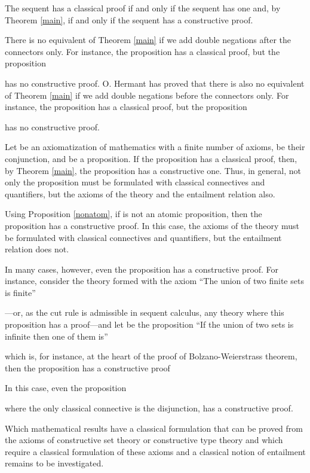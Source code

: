 \documentclass{article}
\begin{document}
The sequent  has a classical proof
if and only if the sequent 
 has one and, by Theorem \ref{main}, 
if and only if the sequent  has a constructive proof.

\smallskip

There is no equivalent of Theorem \ref{main} if we add double negations 
after the connectors only. For instance, the proposition
 has a classical proof, but the proposition

has no constructive proof. O. Hermant \cite{Hermant} has proved that 
there is also no equivalent of Theorem \ref{main} if we add double 
negations 
before the connectors only. For instance, the proposition
 has a classical proof, 
but the 
proposition
 
has no constructive proof.



Let  be an axiomatization of mathematics with a finite
number of axioms,  be their conjunction, 
and  be a proposition. If the proposition
 has a classical proof, then, by Theorem \ref{main}, 
the proposition  has a constructive one.  
Thus, in general, not only
the proposition  must be formulated with classical connectives 
and quantifiers, but the axioms of the theory and the entailment relation 
also.

Using Proposition \ref{nonatom}, if  is not an atomic proposition,
then the proposition  has a constructive
proof.  In this case, the axioms of the theory must be formulated with
classical connectives and quantifiers, but the entailment relation
does not. 

In many cases, however, even the proposition  has a constructive proof.
For instance, consider the theory formed with the axiom 
``The union of two finite sets is finite'' 

---or, as the cut rule is admissible in sequent calculus, any theory 
where this proposition has a proof---and let 
 be the proposition 
``If the union of two sets is infinite then one of them is''

which is, for instance,
at the heart of the proof of Bolzano-Weierstrass theorem, 
then the proposition  has a constructive proof


In this case, even the proposition

where the only classical connective is the disjunction, 
has a constructive proof.

Which mathematical results have a classical formulation that can be
proved from the axioms of constructive set theory or constructive type
theory and which require a classical formulation of these axioms 
and a classical notion of entailment remains to be investigated.
\end{document}
